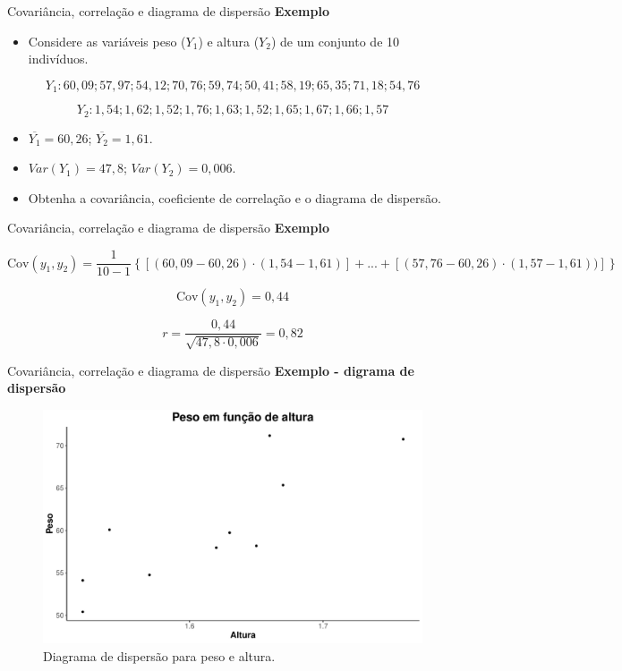 \documentclass[
  ignorenonframetext,
  serif,
  professionalfont,
  usenames,
  dvipsnames,
  aspectratio = 169]{beamer}
\providecommand{\tightlist}{%
  \setlength{\itemsep}{0pt}\setlength{\parskip}{0pt}}
\renewcommand{\tightlist}{%
  \setlength{\itemsep}{0\baselineskip}
  \setlength{\parskip}{0.25\baselineskip}
}
\begin{document}
\begin{frame}{Covariância, correlação e diagrama de dispersão}
\label{covariuxe2ncia-correlauxe7uxe3o-e-diagrama-de-dispersuxe3o}
\textbf{Exemplo}

\begin{itemize}
\tightlist
\item
  Considere as variáveis peso (\(Y_1\)) e altura (\(Y_2\)) de um
  conjunto de 10 indivíduos.
\end{itemize}

\[Y_1: 60,09; 57,97; 54,12; 70,76; 59,74; 50,41; 58,19; 65,35; 71,18; 54,76\]

\[Y_2: 1,54; 1,62; 1,52; 1,76; 1,63; 1,52; 1,65; 1,67; 1,66; 1,57\]

\begin{itemize}
\item
  \(\overline{Y_1} = 60,26\); \(\overline{Y_2} = 1,61\).
\item
  \(Var(Y_1) = 47,8\); \(Var(Y_2) = 0,006\).
\item
  Obtenha a covariância, coeficiente de correlação e o diagrama de
  dispersão.
\end{itemize}
\end{frame}

\begin{frame}{Covariância, correlação e diagrama de dispersão}
\label{covariuxe2ncia-correlauxe7uxe3o-e-diagrama-de-dispersuxe3o-1}
\textbf{Exemplo}

\[
\textrm{Cov}(y_1, y_2) = \frac{1}{10 - 1} \displaystyle \left \{ \left [ (60,09 - 60,26)\cdot (1,54 - 1,61) \right ] + ... + \left [ (57,76 - 60,26)\cdot (1,57 - 1,61)) \right ] \right \}
\]

\[
\textrm{Cov}(y_1, y_2) = 0,44
\]

\[
r  = \frac{0,44}{\sqrt{47,8\cdot 0,006}} = 0,82
\]
\end{frame}

\begin{frame}{Covariância, correlação e diagrama de dispersão}
\label{covariuxe2ncia-correlauxe7uxe3o-e-diagrama-de-dispersuxe3o-2}
\textbf{Exemplo - digrama de dispersão}

\begin{figure}

{\centering \includegraphics[width=0.65\linewidth]{encontro2_files/figure-beamer/unnamed-chunk-34-1} 

}

\caption{Diagrama de dispersão para peso e altura.}\label{fig:unnamed-chunk-34}
\end{figure}
\end{frame}
\end{document}

